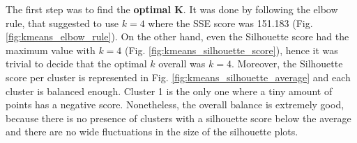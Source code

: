 The first step was to find the \textbf{optimal K}. It was done by following the elbow rule, that suggested to use $k=4$ where the SSE score was 151.183 (Fig. \ref{fig:kmeans_elbow_rule}). On the other hand, even the Silhouette score had the maximum value with $k=4$ (Fig. \ref{fig:kmeans_silhouette_score}), hence it was trivial to decide that the optimal $k$ overall was $k=4$. Moreover, the Silhouette score per cluster is represented in Fig. \ref{fig:kmeans_silhouette_average} and each cluster is balanced enough. Cluster 1 is the only one where a tiny amount of points has a negative score. Nonetheless, the overall balance is extremely good, because there is no presence of clusters with a silhouette score below the average and there are no wide fluctuations in the size of the silhouette plots.

